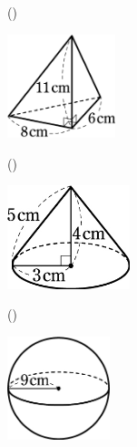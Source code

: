 \documentclass[
  12pt,a4paper,lualatex,ja=standard]{bxjsarticle}
\begin{document}
\begin{flushleft}
\begin{multicols}{3}
\begin{center}
\end{center}

\end{multicols}

\vfill

\begin{multicols}{3}

()\hspace{2.5pt}

\begin{center}
\def\@captype{figure}
\includegraphics[height=30mm]{img/img10.jpg}

\end{center}

\columnbreak

()\hspace{2.5pt}

\begin{center}
\def\@captype{figure}
\includegraphics[height=30mm]{img/img14.jpg}

\end{center}

\columnbreak

()\hspace{2.5pt}

\begin{center}
\def\@captype{figure}
\includegraphics[height=30mm]{img/img12.jpg}

\end{center}


\end{multicols}
\end{flushleft}
\end{document}

